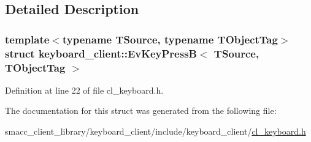 \subsection{Detailed Description}
\subsubsection*{template$<$typename T\+Source, typename T\+Object\+Tag$>$\newline
struct keyboard\+\_\+client\+::\+Ev\+Key\+Press\+B$<$ T\+Source, T\+Object\+Tag $>$}



Definition at line 22 of file cl\+\_\+keyboard.\+h.



The documentation for this struct was generated from the following file\+:\begin{DoxyCompactItemize}
\item 
smacc\+\_\+client\+\_\+library/keyboard\+\_\+client/include/keyboard\+\_\+client/\hyperlink{cl__keyboard_8h}{cl\+\_\+keyboard.\+h}\end{DoxyCompactItemize}
